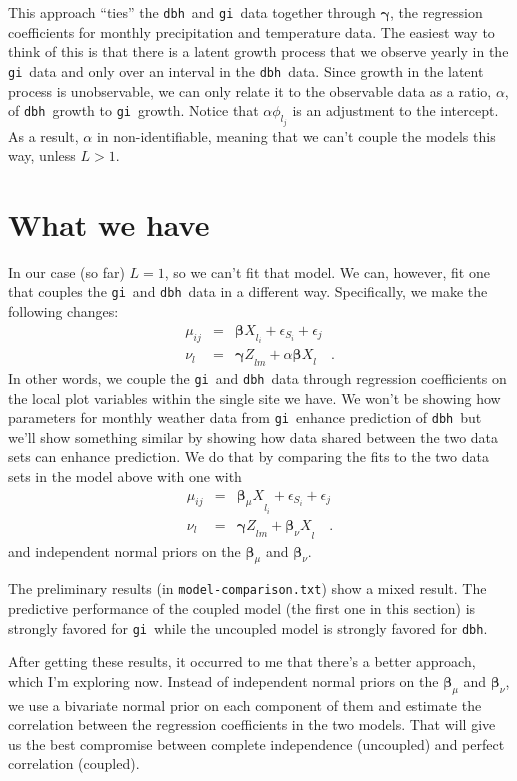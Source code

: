 \documentclass[12pt]{article}
\newcommand{\gi}{{\tt gi}}
\newcommand{\dbh}{{\tt dbh}}
\begin{document}
This approach ``ties'' the \dbh\ and \gi\ data together through
$\bm\gamma$, the regression coefficients for monthly precipitation and
temperature data. The easiest way to think of this is that there is a
latent growth process that we observe yearly in the \gi\ data and only
over an interval in the \dbh\ data. Since growth in the latent process
is unobservable, we can only relate it to the observable data as a
ratio, $\alpha$, of \dbh\ growth to \gi\ growth. Notice that
$\alpha\phi_{l_j}$ is an adjustment to the intercept. As a result,
$\alpha$ in non-identifiable, meaning that we can't couple the models
this way, unless $L > 1$.

\section*{What we have}

In our case (so far) $L = 1$, so we can't fit that model. We can,
however, fit one that couples the \gi\ and \dbh\ data in a different
way. Specifically, we make the following changes:
\begin{eqnarray*}
\mu_{ij} &=& {\bm\beta X}_{l_i} + \epsilon_{S_i} + \epsilon_{j} \\
\nu_l &=& {\bm\gamma Z}_{lm} + \alpha{\bm\beta X}_l \quad .
\end{eqnarray*}
In other words, we couple the \gi\ and \dbh\ data through regression
coefficients on the local plot variables within the single site we
have. We won't be showing how parameters for monthly weather data from
\gi\ enhance prediction of \dbh\, but we'll show something similar by
showing how data shared between the two data sets can enhance
prediction. We do that by comparing the fits to the two data sets in
the model above with one with
\begin{eqnarray*}
\mu_{ij} &=& {\bm\beta_{\mu} X}_{l_i} + \epsilon_{S_i} + \epsilon_{j} \\
\nu_l &=& {\bm\gamma Z}_{lm} + {\bm\beta_{\nu} X}_l \quad .
\end{eqnarray*}
and independent normal priors on the $\bm\beta_{\mu}$ and $\bm\beta_{\nu}$.

The preliminary results (in {\tt model-comparison.txt}) show a mixed
result. The predictive performance of the coupled model (the first one
in this section) is strongly favored for \gi\, while the uncoupled
model is strongly favored for \dbh.

After getting these results, it occurred to me that there's a better
approach, which I'm exploring now. Instead of independent normal
priors on the $\bm\beta_{\mu}$ and $\bm\beta_{\nu}$, we use a
bivariate normal prior on each component of them and estimate the
correlation between the regression coefficients in the two
models. That will give us the best compromise between complete
independence (uncoupled) and perfect correlation (coupled).
\end{document}
